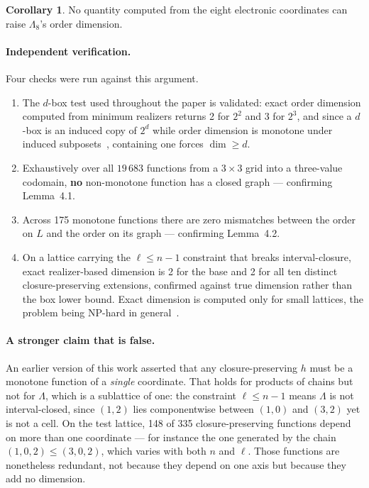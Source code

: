 \documentclass[11pt,a4paper]{article}
\theoremstyle{definition}
\newtheorem{corollary}[proposition]{Corollary}
\newcommand{\Lm}{\ensuremath{\Lambda}}
\newcommand{\Le}{\ensuremath{\Lambda_{8}}}
\begin{document}
\begin{corollary}
No quantity computed from the eight electronic coordinates can raise \Le{}'s
order dimension.
\end{corollary}

\paragraph{Independent verification.} Four checks were run against this
argument.
\begin{enumerate}[leftmargin=*,itemsep=1pt]
\item The $d$-box test used throughout the paper is validated: exact order
dimension computed from minimum realizers returns 2 for $2^{2}$ and 3 for
$2^{3}$, and since a $d$-box is an induced copy of $2^{d}$ while order dimension
is monotone under induced subposets~\cite{trotter}, containing one forces
$\dim\ge d$.
\item Exhaustively over all $19\,683$ functions from a $3\times3$ grid into a
three-value codomain, \textbf{no} non-monotone function has a closed graph ---
confirming Lemma~4.1.
\item Across 175 monotone functions there are zero mismatches between the order
on $L$ and the order on its graph --- confirming Lemma~4.2.
\item On a lattice carrying the $\ell\le n-1$ constraint that breaks
interval-closure, exact realizer-based dimension is 2 for the base and 2 for all
ten distinct closure-preserving extensions, confirmed against true dimension
rather than the box lower bound. Exact dimension is computed only for small
lattices, the problem being NP-hard in general~\cite{yannakakis}.
\end{enumerate}

\paragraph{A stronger claim that is false.} An earlier version of this work
asserted that any closure-preserving $h$ must be a monotone function of a
\emph{single} coordinate. That holds for products of chains but not for \Lm{},
which is a sublattice of one: the constraint $\ell\le n-1$ means \Lm{} is not
interval-closed, since $(1,2)$ lies componentwise between $(1,0)$ and $(3,2)$
yet is not a cell. On the test lattice, 148 of 335 closure-preserving functions
depend on more than one coordinate --- for instance the one generated by the
chain $(1,0,2)\le(3,0,2)$, which varies with both $n$ and $\ell$. Those
functions are nonetheless redundant, not because they depend on one axis but
because they add no dimension.
\end{document}
